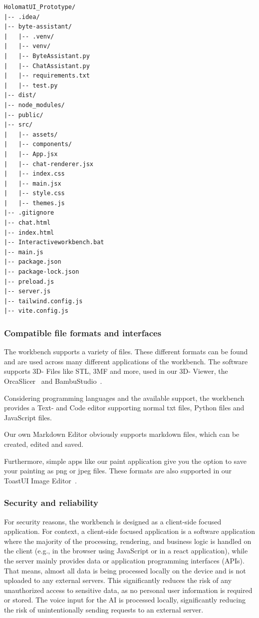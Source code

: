 \documentclass[a4paper,12pt]{article}
\begin{document}
\newpage
\begin{center}
\begin{lstlisting}[style=code, numbers=none]
HolomatUI_Prototype/
|-- .idea/
|-- byte-assistant/
|   |-- .venv/
|   |-- venv/
|   |-- ByteAssistant.py
|   |-- ChatAssistant.py
|   |-- requirements.txt
|   |-- test.py
|-- dist/
|-- node_modules/
|-- public/
|-- src/
|   |-- assets/
|   |-- components/
|   |-- App.jsx
|   |-- chat-renderer.jsx
|   |-- index.css
|   |-- main.jsx
|   |-- style.css
|   |-- themes.js
|-- .gitignore
|-- chat.html
|-- index.html
|-- Interactiveworkbench.bat
|-- main.js
|-- package.json
|-- package-lock.json
|-- preload.js
|-- server.js
|-- tailwind.config.js
|-- vite.config.js
\end{lstlisting}
\end{center}

\subsubsection{Compatible file formats and interfaces}
The workbench supports a variety of files. These different formats can be found and are used across many different applications of the workbench. The software supports 3D- Files like STL, 3MF and more, used in our 3D- Viewer, the OrcaSlicer~\cite{orcaslicer} and BambuStudio~\cite{bambustudio}. 

Considering programming languages and the available support, the workbench provides a Text- and Code editor supporting normal txt files, Python files and JavaScript files. 

Our own Markdown Editor obviously supports markdown files, which can be created, edited and saved. 

Furthermore, simple apps like our paint application give you the option to save your painting as png or jpeg files. 
These formats are also supported in our ToastUI Image Editor~\cite{toastui}. 

\newpage
\subsubsection{Security and reliability}
For security reasons, the workbench is designed as a client-side focused application. 
For context, a client-side focused application is a software application where the majority of the processing, rendering, and business logic is handled on the client (e.g., in the browser using JavaScript or in a react application), while the server mainly provides data or application programming interfaces (APIs).~\cite{clientside}
That means, almost all data is being processed locally on the device and is not uploaded to any external servers. This significantly reduces the risk of any unauthorized access to sensitive data, as no personal user information is required or stored. The voice input for the AI is processed locally, significantly reducing the risk of unintentionally sending requests to an external server.
\end{document}
